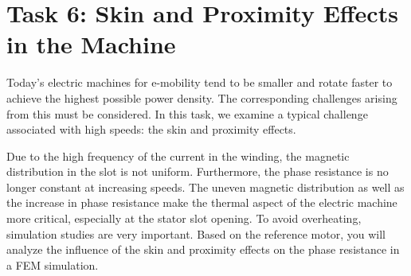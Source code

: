 %
%

\chapter{Task 6: Skin and Proximity Effects in the Machine}

Today’s electric machines for e-mobility tend to be smaller and rotate faster to achieve the highest possible power density. The corresponding challenges arising from this must be considered. In this task, we examine a typical challenge associated with high speeds: the skin and proximity effects.

Due to the high frequency of the current in the winding, the magnetic distribution in the slot is not uniform. Furthermore, the phase resistance is no longer constant at increasing speeds. The uneven magnetic distribution as well as the increase in phase resistance make the thermal aspect of the electric machine more critical, especially at the stator slot opening. To avoid overheating, simulation studies are very important. Based on the reference motor, you will analyze the influence of the skin and proximity effects on the phase resistance in a \gls{FEM} simulation.

\bigskip


